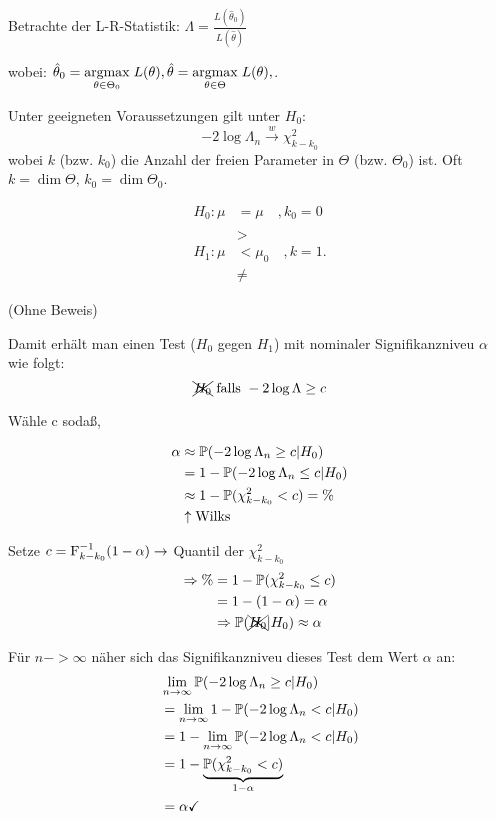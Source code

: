 \documentclass{tstextbook}
\begin{document}
Betrachte der L-R-Statistik: $ \Lambda= \frac{L(\hat{\theta}_0)}{ L(\hat{\theta})} $

wobei: $ \hat{\theta}_0 = \underset{\theta \in \Theta_0}{\operatorname{argmax}} \; L(\theta), \hat{\theta} = \underset{\theta \in \Theta}{\operatorname{argmax}} \; L(\theta),  $. 
	
\begin{satz}
	Unter geeigneten Voraussetzungen gilt unter $ H_0 $:
	\[
	-2\log\Lambda_n \xrightarrow{w} \chi^2_{k-k_0}
	\]
	wobei $ k $ (bzw. $ k_0 $) die Anzahl der freien Parameter in $ \Theta $ (bzw. $ \Theta_0 $) ist. Oft $ k = \dim \Theta $, $ k_0 = \dim \Theta_0 $.
		
	\[
	\begin{aligned}
		H_0\colon \mu & = \mu \quad , k_0 = 0 \\ 
		& \\
		& > \\
		H_1\colon \mu & < \mu_0 \quad , k =1 .\\
		& \ne
	\end{aligned}
	\]
\end{satz}

(Ohne Beweis)

	Damit erhält man einen Test ($H_0$ gegen $H_1$) mit nominaler Signifikanzniveu $\alpha$ wie folgt:
	\[ \xcancel{H_0} \text{ falls } -2 \log \Lambda \ge c \]
	
	Wähle c sodaß,
	
	\[
	\begin{aligned}
			\alpha & \approx \mathbb P (-2 \log \Lambda_n \ge c | H_0) \\
			& = 1- \mathbb P (-2 \log \Lambda_n \le c | H_0) \\
			& \approx 1- \mathbb P( \chi_{k-k_0}^2 < c ) =  \% \\
			& \uparrow \text{Wilks}
	\end{aligned}
	\]
	
	Setze $c= \operatorname{F}_{k-k_0}^{-1} (1-\alpha) \rightarrow  $ Quantil der $\chi_{k-k_0}^2$ 
	\[
	\begin{aligned}
			\Rightarrow \%&=  1- \mathbb P( \chi_{k-k_0}^2 \le c ) \\
			&= 1-(1- \alpha ) = \alpha \\
			& \Rightarrow \mathbb P(\xcancel{H_0}| H_0) \approx \alpha
	\end{aligned}
	\]
	
	Für $n-> \infty$ näher sich das Signifikanzniveu dieses Test dem Wert $\alpha$ an:
	\[
	\begin{aligned}
			& \lim_{n \to \infty}  \mathbb P (-2 \log \Lambda_n \ge c | H_0) \\
			&= \lim_{n \to \infty} 1-  \mathbb P (-2 \log \Lambda_n < c | H_0) \\
			&= 1 - \lim_{n \to \infty}  \mathbb P (-2 \log \Lambda_n < c | H_0) \\
			&= 1- \underbrace{ \mathbb P( \chi_{k-k_0}^2 < c ) }_{1-\alpha }\\
			&= \alpha \checkmark
	\end{aligned}
	\]
	
\end{document}
